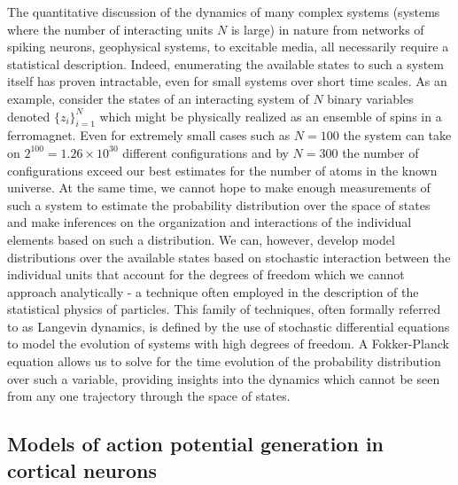 \documentclass{ucetd}
\begin{document}
The quantitative discussion of the dynamics of many complex systems (systems where the number of interacting units $N$ is large) in nature from networks of spiking neurons, geophysical systems, to excitable media, all necessarily require a statistical description. Indeed, enumerating the available states to such a system itself has proven intractable, even for small systems over short time scales. As an example, consider the states of an interacting system of $N$ binary variables denoted $\{z_{i}\}_{i=1}^{N}$ which might be physically realized as an ensemble of spins in a ferromagnet. Even for extremely small cases such as $N=100$ the system can take on $2^{100} = 1.26\times 10^{30}$ different configurations and by $N=300$ the number of configurations exceed our best estimates for the number of atoms in the known universe. At the same time, we cannot hope to make enough measurements of such a system to estimate the probability distribution over the space of states and make inferences on the organization and interactions of the individual elements based on such a distribution. We can, however, develop model distributions over the available states based on stochastic interaction between the individual units that account for the degrees of freedom which we cannot approach analytically - a technique often employed in the description of the statistical physics of particles. This family of techniques, often formally referred to as Langevin dynamics, is defined by the use of stochastic differential equations to model the evolution of systems with high degrees of freedom. A Fokker-Planck equation allows us to solve for the time evolution of the probability distribution over such a variable, providing insights into the dynamics which cannot be seen from any one trajectory through the space of states. 

\subsection{Models of action potential generation in cortical neurons}
\end{document}
